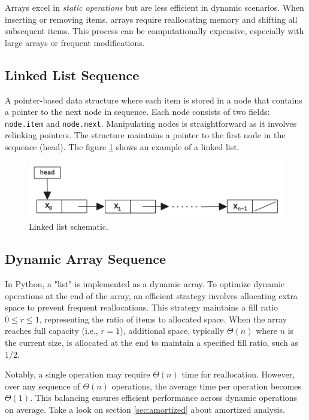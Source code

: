 \documentclass[a4paper,10pt]{article}
\newcommand{\hlt}[1]{\colorbox{color3}{#1}}
\begin{document}
Arrays excel in \textit{static operations} but are less efficient in dynamic scenarios. When inserting or removing items, arrays require \hlt{reallocating memory} and \hlt{shifting all subsequent items}. This process can be computationally expensive, especially with large arrays or frequent modifications.

\subsection{Linked List Sequence}

A pointer-based data structure where each item is stored in a node that contains a pointer to the next node in sequence. Each node consists of two fields: \texttt{node.item} and \texttt{node.next}. Manipulating nodes is straightforward as it involves relinking pointers. The structure maintains a pointer to the first node in the sequence (\hlt{head}). The figure \ref{fig:linked_list} shows an example of a linked list. 

\begin{figure}[ht]
\centering
\includegraphics[width=0.5\linewidth]{figures/linked_list.png}
\caption{Linked list schematic.}
\label{fig:linked_list}
\end{figure}

\subsection{Dynamic Array Sequence}

In Python, a "list" is implemented as a dynamic array. To optimize dynamic operations at the end of the array, an efficient strategy involves allocating extra space to \hlt{prevent frequent reallocations}. This strategy maintains a fill ratio \( 0 \leq r \leq 1 \), representing the ratio of items to allocated space. When the array reaches full capacity (i.e., \( r = 1 \)), additional space, typically \( \Theta(n) \) where \( n \) is the current size, is allocated at the end to maintain a specified fill ratio, such as 1/2.

Notably, a single operation may require \( \Theta(n) \) time for reallocation. However, over any sequence of \( \Theta(n) \) operations, the average time per operation becomes \( \Theta(1) \). This balancing ensures efficient performance across dynamic operations on average. Take a look on section \ref{sec:amortized} about amortized analysis. 
 
\end{document}
